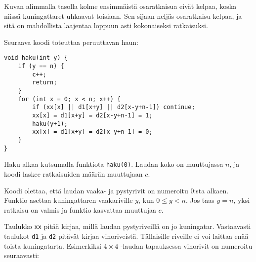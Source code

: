 Kuvan alimmalla tasolla kolme ensimmäistä osaratkaisua
eivät kelpaa, koska niissä kuningattaret uhkaavat
toisiaan.
Sen sijaan neljäs osaratkaisu kelpaa,
ja sitä on mahdollista laajentaa loppuun asti
kokonaiseksi ratkaisuksi.
\newpage

Seuraava koodi toteuttaa peruuttavan haun:

\begin{lstlisting}
void haku(int y) {
    if (y == n) {
        c++;
        return;
    }
    for (int x = 0; x < n; x++) {
        if (xx[x] || d1[x+y] || d2[x-y+n-1]) continue;
        xx[x] = d1[x+y] = d2[x-y+n-1] = 1;
        haku(y+1);
        xx[x] = d1[x+y] = d2[x-y+n-1] = 0;
    }
}
\end{lstlisting}
Haku alkaa kutsumalla funktiota \texttt{haku(0)}.
Laudan koko on muuttujassa $n$,
ja koodi laskee ratkaisuiden määrän
muuttujaan $c$.

Koodi olettaa, että laudan vaaka- ja pystyrivit
on numeroitu 0:sta alkaen.
Funktio asettaa kuningattaren vaakariville $y$,
kun $0 \le y < n$.
Jos taas $y=n$, yksi ratkaisu on valmis
ja funktio kasvattaa muuttujaa $c$.

Taulukko \texttt{xx} pitää kirjaa,
millä laudan pystyriveillä on jo kuningatar.
Vastaavasti taulukot \texttt{d1} ja \texttt{d2}
pitävät kirjaa vinoriveistä.
Tällaisille riveille ei voi laittaa enää toista
kuningatarta.
Esimerkiksi $4 \times 4$ -laudan tapauksessa
vinorivit on numeroitu seuraavasti:

\begin{center}
\end{center}

